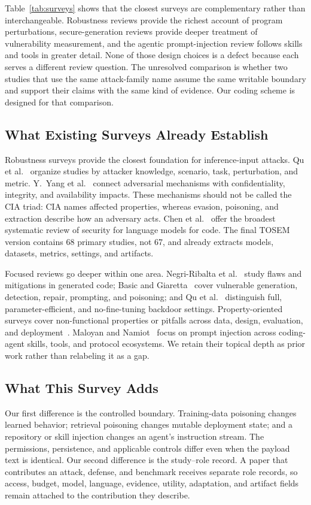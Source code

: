 \documentclass[acmsmall,screen,review]{acmart}
\begin{document}
Table~\ref{tab:surveys} shows that the closest surveys are complementary rather than interchangeable. Robustness reviews provide the richest account of program perturbations, secure-generation reviews provide deeper treatment of vulnerability measurement, and the agentic prompt-injection review follows skills and tools in greater detail. None of those design choices is a defect because each serves a different review question. The unresolved comparison is whether two studies that use the same attack-family name assume the same writable boundary and support their claims with the same kind of evidence. Our coding scheme is designed for that comparison.

\subsection{What Existing Surveys Already Establish}
Robustness surveys provide the closest foundation for inference-input attacks. Qu et al.~\cite{qu2024robustnesssurvey} organize studies by attacker knowledge, scenario, task, perturbation, and metric. Y.~Yang et al.~\cite{yang2024survey} connect adversarial mechanisms with confidentiality, integrity, and availability impacts. These mechanisms should not be called the CIA triad: CIA names affected properties, whereas evasion, poisoning, and extraction describe how an adversary acts. Chen et al.~\cite{securitycode2024slr} offer the broadest systematic review of security for language models for code. The final TOSEM version contains 68 primary studies, not 67, and already extracts models, datasets, metrics, settings, and artifacts.

Focused reviews go deeper within one area. Negri-Ribalta et al.~\cite{negriribalta2024securegeneration} study flaws and mitigations in generated code; Basic and Giaretta~\cite{basic2026codesecurity} cover vulnerable generation, detection, repair, prompting, and poisoning; and Qu et al.~\cite{qu2025backdoorsurvey} distinguish full, parameter-efficient, and no-fine-tuning backdoor settings. Property-oriented surveys cover non-functional properties or pitfalls across data, design, evaluation, and deployment~\cite{robustness2024llms,she2026pitfalls}. Maloyan and Namiot~\cite{maloyan2026promptinjection} focus on prompt injection across coding-agent skills, tools, and protocol ecosystems. We retain their topical depth as prior work rather than relabeling it as a gap.

\subsection{What This Survey Adds}
Our first difference is the controlled boundary. Training-data poisoning changes learned behavior; retrieval poisoning changes mutable deployment state; and a repository or skill injection changes an agent's instruction stream. The permissions, persistence, and applicable controls differ even when the payload text is identical. Our second difference is the study--role record. A paper that contributes an attack, defense, and benchmark receives separate role records, so access, budget, model, language, evidence, utility, adaptation, and artifact fields remain attached to the contribution they describe.
\end{document}
